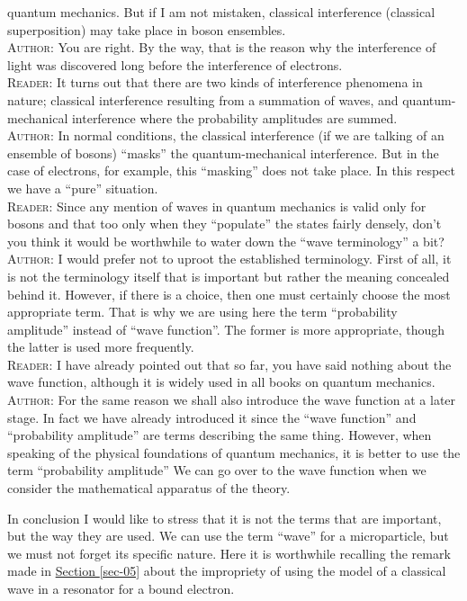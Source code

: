 \documentclass[a4paper,sfsidenotes,colorlinks=true]{tufte-book}
\numberwithin{equation}{section}
\numberwithin{figure}{section}
\begin{document}
quantum mechanics. But if I am not mistaken, classical interference
(classical superposition) may take place in boson ensembles.
\\
\textsc{Author}: You are right. By the way, that is the reason why the
interference of light was discovered long before the interference of
electrons.
\\
\textsc{Reader}: It turns out that there are two kinds of interference
phenomena in nature; classical interference resulting from a summation
of waves, and quantum-mechanical interference where the probability
amplitudes are summed.
\\
\textsc{Author}: In normal conditions, the classical interference (if
we are talking of an ensemble of bosons) ``masks'' the
quantum-mechanical interference. But in the case of electrons, for
example, this ``masking'' does not take place. In this respect we have
a ``pure'' situation.
\\
\textsc{Reader}: Since any mention of waves in quantum mechanics is
valid only for bosons and that too only when they ``populate'' the
states fairly densely, don't you think it would be worthwhile to water
down the ``wave terminology'' a bit?
\\
\textsc{Author}: I would prefer not to uproot the established
terminology. First of all, it is not the terminology itself that is
important but rather the meaning concealed behind it. However, if
there is a choice, then one must certainly choose the most appropriate
term. That is why we are using here the term ``probability amplitude''
instead of ``wave function''. The former is more appropriate, though
the latter is used more frequently.
\\
\textsc{Reader}: I have already pointed out that so far, you have said
nothing about the wave function, although it is widely used in all
books on quantum mechanics.
\\
\textsc{Author}: For the same reason we shall also introduce the wave
function at a later stage. In fact we have already introduced it since
the ``wave function'' and ``probability amplitude'' are terms
describing the same thing. However, when speaking of the physical
foundations of quantum mechanics, it is better to use the term
``probability amplitude'' We can go over to the wave function when we
consider the mathematical apparatus of the theory.

In conclusion I would like to stress that it is not the terms that are important, but the way they are used. We can use the term ``wave'' for a microparticle, but we must not forget its specific nature. Here it is worthwhile recalling the remark made in \hyperref[sec-05]{Section \ref{sec-05}} about the impropriety of using the model of a classical wave in a resonator for a bound electron.
\end{document}
